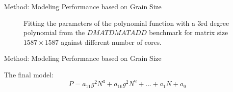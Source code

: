 \documentclass[10pt]{beamer}
\begin{document}
\begin{frame}{Method: Modeling Performance based on Grain Size}
\begin{outline}
\begin{figure}[H]
			\caption{Fitting the parameters of the polynomial function with a $3$rd degree polynomial from the $DMATDMATADD$ benchmark for matrix size $1587\times1587$ against different number of cores.}	
			\label{fig15}
		\end{figure}
	\end{outline}
\end{frame}

\begin{frame}{Method: Modeling Performance based on Grain Size}
	\begin{outline}
		The final model: $$P=a_{11}g^2N^3+a_{10}g^2N^2+...+a_1N+a_0$$
	\begin{figure}[H]
		\centering
		\hfill

\end{figure}
\end{outline}
\end{frame}
\end{document}
